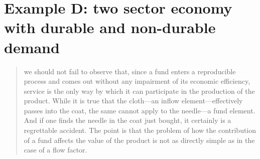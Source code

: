 %
%
%
\chapter{Example D: two sector economy with durable and non-durable demand}
\label{chap:two_sector_durable} %





\begin{quotation}
we should not fail to observe that, since a fund enters a reproducible process and comes out without any impairment of its economic efficiency, service is the only way by which it can participate in the production of the product. While it is true that the cloth---an inflow element---effectively passes into the coat, the same cannot apply to the needle---a fund element. And if one finds the needle in the coat just bought, it certainly is a regrettable accident. The point is that the problem of how the contribution of a fund affects the value of the product is not as directly simple as in the case of a flow factor. \cite{G-R1970}
\end{quotation} 

